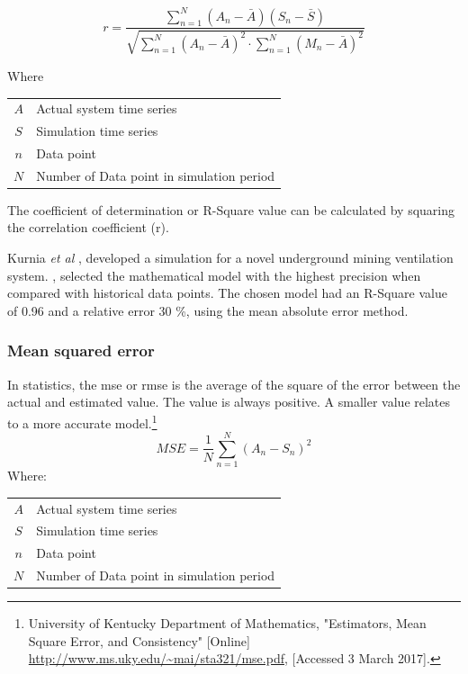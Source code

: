  		\begin{equation}
 		\label{eq: Correlation coefficient}
 		r = \dfrac{\sum_{n=1}^{N}(A_n - \bar{A})(S_n - \bar{S})}{\sqrt{\sum_{n=1}^{N}(A_n - \bar{A})^2 \cdot \sum_{n=1}^{N}(M_n - \bar{A})^2}}
 		\end{equation}
 		\par
 		Where \par
 		\begin{table}[h!]
 			\centering
 			\begin{tabular}{cl}
 				$A$ & Actual system time series \\
 				$S$ & Simulation time series \\
 				$n$ & Data point \\
 				$N$ & Number of Data point in simulation period \\
 			\end{tabular} 
 		\end{table}	
 		The coefficient of determination or R-Square value can be calculated by squaring the correlation coefficient (r). 
 		\par 
 			Kurnia \textit{et al} \cite{kurnia2014simulation},\cite{kurnia2014dust} developed a simulation for a novel underground mining ventilation system. \cite{kurnia2014simulation},\cite{kurnia2014dust} selected the mathematical model with the highest precision when compared with historical data points. The chosen model had an R-Square value of 0.96 and a relative error 30 \%, using the mean absolute error method. 
 			
 		\subsubsection{Mean squared error}	
 		In statistics, the \gls{mse} or \gls{rmse} is the average of the square of the error between the actual and estimated value. The value is always positive. A smaller value relates to a more accurate model.\footnote{University of Kentucky Department of Mathematics, "Estimators, Mean Square Error, and
 			Consistency" [Online] \url{http://www.ms.uky.edu/~mai/sta321/mse.pdf}, [Accessed 3 March 2017].}
 			\begin{equation}
 				\label{eq: rmse}
 				MSE = \dfrac{1}{N}\sum_{n=1}^{N}{(A_{n} - S_{n})^2}
 			\end{equation}
 			Where: \par
 			\begin{table}[h!]
 				\centering
 				\begin{tabular}{cl}
 					$A$ & Actual system time series \\
 					$S$ & Simulation time series \\
 					$n$ & Data point \\
 					$N$ & Number of Data point in simulation period \\
 			\end{tabular} 
 			\end{table}			
